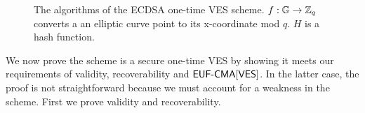 \begin{figure}[h]
\begin{mdframed}
\begin{pchstack}[center]
    \pchspace
    \pchspace
    \pchspace
    \end{pchstack}
    \end{mdframed}
    \caption{The algorithms of the ECDSA one-time VES scheme. $f: \mathbb{G} \rightarrow \mathbb{Z}_q$ converts a an elliptic curve point to its x-coordinate mod $q$. $H$ is a hash function.}
    \label{fig:ecdsa-adaptor}
\end{figure}

We now prove the scheme is a secure one-time VES by showing it meets our requirements of validity, recoverability and $\textsf{EUF-CMA}[\textsf{VES}]$.
In the latter case, the proof is not straightforward because we must account for a weakness in the scheme.
First we prove validity and recoverability.

